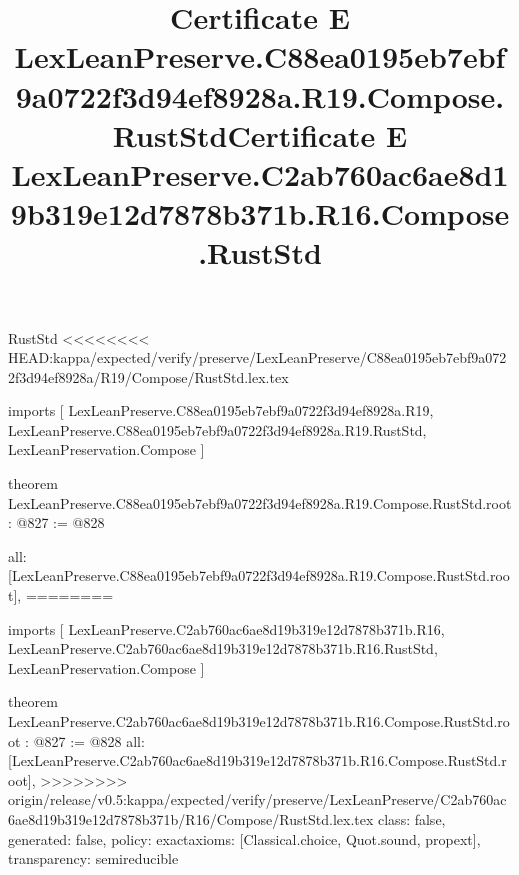 \begin{lexlean}{RustStd}
<<<<<<<< HEAD:kappa/expected/verify/preserve/LexLeanPreserve/C88ea0195eb7ebf9a0722f3d94ef8928a/R19/Compose/RustStd.lex.tex
\title{Certificate E LexLeanPreserve.C88ea0195eb7ebf9a0722f3d94ef8928a.R19.Compose.RustStd}
\begin{coremodule}
imports [
  LexLeanPreserve.C88ea0195eb7ebf9a0722f3d94ef8928a.R19,
  LexLeanPreserve.C88ea0195eb7ebf9a0722f3d94ef8928a.R19.RustStd,
  LexLeanPreservation.Compose
]

theorem LexLeanPreserve.C88ea0195eb7ebf9a0722f3d94ef8928a.R19.Compose.RustStd.root : @827 := @828 {
  all: [LexLeanPreserve.C88ea0195eb7ebf9a0722f3d94ef8928a.R19.Compose.RustStd.root],
========
\title{Certificate E LexLeanPreserve.C2ab760ac6ae8d19b319e12d7878b371b.R16.Compose.RustStd}
\begin{coremodule}
imports [
  LexLeanPreserve.C2ab760ac6ae8d19b319e12d7878b371b.R16,
  LexLeanPreserve.C2ab760ac6ae8d19b319e12d7878b371b.R16.RustStd,
  LexLeanPreservation.Compose
]

theorem LexLeanPreserve.C2ab760ac6ae8d19b319e12d7878b371b.R16.Compose.RustStd.root : @827 := @828 {
  all: [LexLeanPreserve.C2ab760ac6ae8d19b319e12d7878b371b.R16.Compose.RustStd.root],
>>>>>>>> origin/release/v0.5:kappa/expected/verify/preserve/LexLeanPreserve/C2ab760ac6ae8d19b319e12d7878b371b/R16/Compose/RustStd.lex.tex
  class: false,
  generated: false,
  policy: exact{axioms: [Classical.choice, Quot.sound, propext]},
  transparency: semireducible
}


\end{coremodule}}
\end{coremodule}
\end{lexlean}
